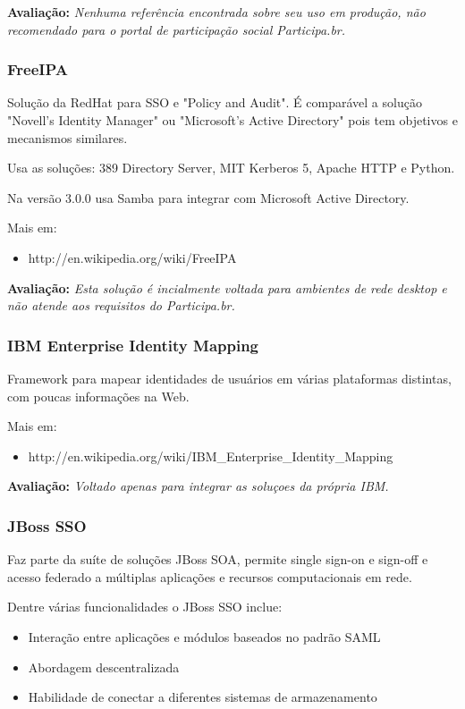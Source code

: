 \documentclass[11pt]{article}
\begin{document}
{\bf Avaliação:} {\it Nenhuma referência encontrada sobre seu uso em produção,
não recomendado para o portal de participação social Participa.br.}

\subsubsection{FreeIPA}

Solução da RedHat para SSO e "Policy and Audit". É comparável a solução
"Novell's Identity Manager" ou "Microsoft's Active Directory" pois tem
objetivos e mecanismos similares.

Usa as soluções: 389 Directory Server, MIT Kerberos 5, Apache HTTP e Python.

Na versão 3.0.0 usa Samba para integrar com Microsoft Active Directory.

Mais em:
\begin{itemize}
  \item{http://en.wikipedia.org/wiki/FreeIPA}
\end{itemize}

{\bf Avaliação:} {\it Esta solução é incialmente voltada para ambientes de
rede desktop e não atende aos requisitos do Participa.br.}

\subsubsection{IBM Enterprise Identity Mapping}

Framework para mapear identidades de usuários em várias plataformas distintas,
com poucas informações na Web.

Mais em:
\begin{itemize}
  \item{http://en.wikipedia.org/wiki/IBM\_Enterprise\_Identity\_Mapping}
\end{itemize}

{\bf Avaliação:} {\it Voltado apenas para integrar as soluçoes da própria
IBM.}

\subsubsection{JBoss SSO}

Faz parte da suíte de soluções JBoss SOA, permite single sign-on e sign-off e
acesso federado a múltiplas aplicações e recursos computacionais em rede.

Dentre várias funcionalidades o JBoss SSO inclue:

\begin{itemize}
  \item{Interação entre aplicações e módulos baseados no padrão SAML}
  \item{Abordagem descentralizada}
  \item{Habilidade de conectar a diferentes sistemas de armazenamento}
\end{itemize}
\end{document}
